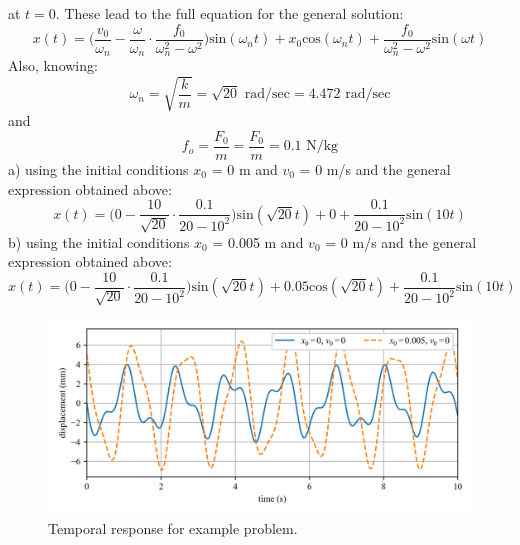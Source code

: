 \documentclass[12pt,letter]{article}
\begin{document}
\begin{example}
	at $t=0$. These lead to the full equation for the general solution:
	\begin{equation}
		x(t) = \Big(\frac{v_0}{\omega_n}-\frac{\omega}{\omega_n}\cdot \frac{f_0}{\omega_n^2-\omega^2}\Big)\text{sin}(\omega_n t) + x_0\text{cos}(\omega_n t) + \frac{f_0}{\omega_n^2-\omega^2}\text{sin}(\omega t)
	\end{equation}								
	Also, knowing:
	\begin{equation}
		\omega_n = \sqrt{\frac{k}{m}} = \sqrt{20} \text{ rad/sec} =  4.472 \text{ rad/sec}
	\end{equation}				
	and
	\begin{equation}
		f_o = \frac{F_0}{m} = \frac{F_0}{m} = 0.1 \text{ N/kg}
	\end{equation}	
	a) using the initial conditions $x_0$ = 0 m and $v_0$ = 0 m/s and the general expression obtained above:
	\begin{equation}
		x(t) = \Big(0-\frac{10}{\sqrt{20}}\cdot \frac{0.1}{20-10^2}\Big)\text{sin}(\sqrt{20} t) + 0 + \frac{0.1}{20-10^2}\text{sin}(10 t)
	\end{equation}			
	b) using the initial conditions $x_0$ = 0.005 m and $v_0$ = 0 m/s and the general expression obtained above:
	\begin{equation}
		x(t) = \Big(0-\frac{10}{\sqrt{20}}\cdot \frac{0.1}{20-10^2}\Big)\text{sin}(\sqrt{20} t) + 0.05\text{cos}(\sqrt{20} t) + \frac{0.1}{20-10^2}\text{sin}(10 t)
	\end{equation}			
	\begin{figure}[H]
		\centering
		\includegraphics[width=1.0\textwidth]{../figures/response_1-DOF-spring_mass_forced.png}
		\caption{Temporal response for example problem.}
	\end{figure}
\end{example}
\end{document}
